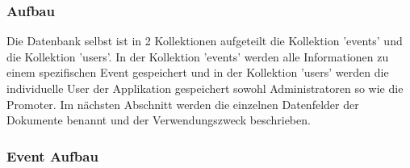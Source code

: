 		\newpage		
		\subsubsection{Aufbau}
			Die Datenbank selbst ist in 2 Kollektionen aufgeteilt die Kollektion 'events' und die Kollektion 'users'. In der Kollektion 'events' werden alle Informationen zu einem spezifischen Event gespeichert und in der Kollektion 'users' werden die individuelle User der Applikation gespeichert sowohl Administratoren so wie die Promoter. Im nächsten Abschnitt werden die einzelnen Datenfelder der Dokumente benannt und der Verwendungszweck beschrieben.

			\subsubsection{Event Aufbau}			
